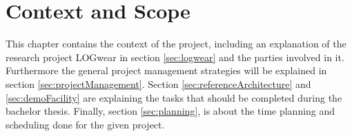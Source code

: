\chapter{Context and Scope}\label{cha:context}
This chapter contains the context of the project, including an explanation of the research project LOGwear in section \ref{sec:logwear} and the parties involved in it. Furthermore the general project management strategies will be explained in section \ref{sec:projectManagement}. Section \ref{sec:referenceArchitecture} and \ref{sec:demoFacility} are explaining the tasks that should be completed during the bachelor thesis. Finally, section \ref{sec:planning}, is about the time planning and scheduling done for the given project.




